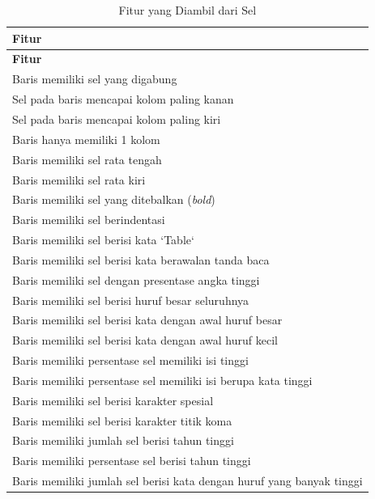 	\begin{small}
	\begin{longtable}{ | p{10cm} | }
	    \caption{Fitur yang Diambil dari Sel}
	    \label{FiturEkstraksi}\\ \hline
	    \centering\bfseries{Fitur} \tabularnewline \hline
	    \endfirsthead
	    \hline
	    \centering\bfseries{Fitur} \tabularnewline \hline
	    \endhead
	    Baris memiliki sel yang digabung \\ \hline
	    Sel pada baris mencapai kolom paling kanan \\ \hline
	    Sel pada baris mencapai kolom paling kiri \\ \hline
	    Baris hanya memiliki 1 kolom \\ \hline
	    Baris memiliki sel rata tengah \\ \hline
	    Baris memiliki sel rata kiri \\ \hline
	    Baris memiliki sel yang ditebalkan (\textit{bold}) \\ \hline
	    Baris memiliki sel berindentasi \\ \hline
	    Baris memiliki sel berisi kata `Table` \\ \hline
	    Baris memiliki sel berisi kata berawalan tanda baca \\ \hline
	    Baris memiliki sel dengan presentase angka tinggi \\ \hline
	    Baris memiliki sel berisi huruf besar seluruhnya \\ \hline
	    Baris memiliki sel berisi kata dengan awal huruf besar \\ \hline
	    Baris memiliki sel berisi kata dengan awal huruf kecil \\ \hline
	    Baris memiliki persentase sel memiliki isi tinggi \\ \hline
	    Baris memiliki persentase sel memiliki isi berupa kata tinggi \\ \hline
	    Baris memiliki sel berisi karakter spesial \\ \hline
	    Baris memiliki sel berisi karakter titik koma \\ \hline
	    Baris memiliki jumlah sel berisi tahun tinggi \\ \hline
	    Baris memiliki persentase sel berisi tahun tinggi \\ \hline
	    Baris memiliki jumlah sel berisi kata dengan huruf yang banyak tinggi \\ \hline
	\end{longtable}
	\end{small}

